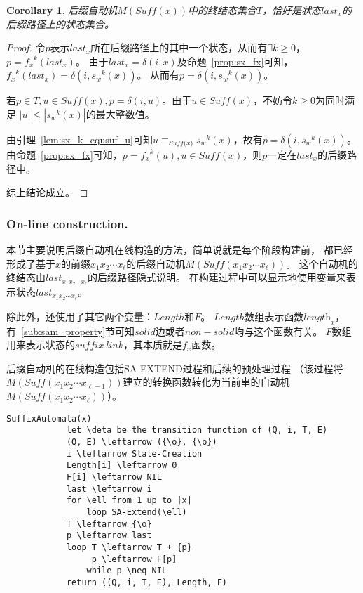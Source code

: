 \documentclass[UTF8]{ctexart}
\newtheorem{cor}[thm]{Corollary}
\theoremstyle{definition}
\theoremstyle{remark}
\numberwithin{equation}{subsection}
\newcommand{\equsuf}[1][x]{\equiv_{\textit{Suff(#1)}}}
\newcommand{\Suff}{\textit{Suff}}
\newcommand{\len}[1][x]{\textit{length}_{#1}}
\begin{document}
	\begin{cor}
	\label{cor:sam_t_lastx}
		后缀自动机$M(\Suff(x))$中的终结态集合$T$，恰好是状态$last_x$的后缀路径上的状态集合。
	\end{cor}
	\begin{proof}
		令$p$表示$last_x$所在后缀路径上的其中一个状态，从而有$\exists k \ge 0$，$p = {f_x}^k(last_x)$。
		由于$last_x = \delta(i, x)$及命题~\ref{prop:sx_fx}可知，${f_x}^k(last_x) = \delta(i, {s_w}^k(x))$。
		从而有$p = \delta(i, {s_w}^k(x))$。
		
		若$p \in T, u \in \Suff(x), p = \delta(i, u)$。由于$u \in \Suff(x)$，不妨令$k \ge 0$为同时满足
		$|u| \le |{s_w}^k(x)|$的最大整数值。
		
		由引理~\ref{lem:sx_k_equsuf_u}可知$u \equsuf[x] {s_w}^k(x)$，故有$p = \delta(i, {s_w}^k(x))$。
		由命题~\ref{prop:sx_fx}可知，$p = {f_x}^k(u), u \in \Suff(x)$，则$p$一定在$last_x$的后缀路径中。
		
		综上结论成立。
	\end{proof}
	
\subsubsection{On-line construction.}
\label{subsub:sam_online_construct}

	本节主要说明后缀自动机在线构造的方法，简单说就是每个阶段构建前，
	都已经形成了基于$x$的前缀$x_1 x_2 \cdots x_{\ell}$的后缀自动机$M(\Suff(x_1 x_2 \cdots x_{\ell}))$。
	这个自动机的终结态由$last_{x_1 x_2 \cdots x_{\ell}}$的后缀路径隐式说明。
	在构建过程中可以显示地使用变量来表示状态$last_{x_1 x_2 \cdots x_{\ell}}$。
	
	除此外，还使用了其它两个变量：$Length$和$F$。
	$Length$数组表示函数$\len[x]$，有~\ref{sub:sam_property}节可知$solid$边或者$non-solid$均与这个函数有关。
	$F$数组用来表示状态的$suffix\ link$，其本质就是$f_x$函数。
	
	后缀自动机的在线构造包括SA-EXTEND过程和后续的预处理过程
	（该过程将$M(\Suff(x_1 x_2 \cdots x_{\ell-1}))$建立的转换函数转化为当前串的自动机$M(\Suff(x_1 x_2 \cdots x_{\ell}))$）。
	\begin{lstlisting}[frame=shadowbox,framexleftmargin=5mm,rulesepcolor=\color{gray},numbers=none]
		SuffixAutomata(x)
			let \deta be the transition function of (Q, i, T, E)
			(Q, E) \leftarrow ({\o}, {\o})
			i \leftarrow State-Creation
			Length[i] \leftarrow 0
			F[i] \leftarrow NIL
			last \leftarrow i
			for \ell from 1 up to |x|
				loop SA-Extend(\ell)
			T \leftarrow {\o}
			p \leftarrow last
			loop T \leftarrow T + {p}
				 p \leftarrow F[p]
				while p \neq NIL
			return ((Q, i, T, E), Length, F)
	\end{lstlisting}
	
\end{document}
